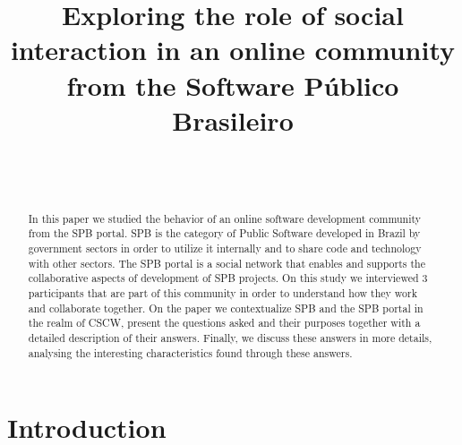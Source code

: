 \documentclass{sigchi}
\begin{document}
\title{Exploring the role of social interaction in an online community from the Software Público Brasileiro}

\author{%
  \\
  \\
}

\maketitle

\begin{abstract}
  In this paper we studied the behavior of an online software development community from the SPB portal. SPB is the category of Public Software developed in Brazil by government sectors in order to utilize it internally and to share code and technology with other sectors. The SPB portal is a social network that enables and supports the collaborative aspects of development of SPB projects. On this study we interviewed 3 participants that are part of this community in order to understand how they work and collaborate together. On the paper we contextualize SPB and the SPB portal in the realm of CSCW, present the questions asked and their purposes together with a detailed description of their answers. Finally, we discuss these answers in more details, analysing the interesting characteristics found through these answers.
\end{abstract}

 


\section{Introduction}
\end{document}
